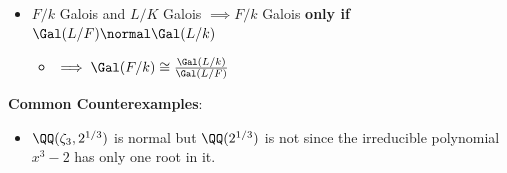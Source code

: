 \begin{itemize}
\tightlist
\item
  \(F/k\) Galois and \(L/K\) Galois \(\implies F/k\) Galois \textbf{only
  if} \(\Gal(L/F) \normal \Gal(L/k)\)

  \begin{itemize}
  \tightlist
  \item
    \(\implies \Gal(F/k) \cong \frac{\Gal(L/k)}{\Gal(L/F)}\)
  \end{itemize}
\end{itemize}

\begin{center}
\end{center}

\textbf{Common Counterexamples}:

\begin{itemize}
\tightlist
\item
  \(\QQ(\zeta_3, 2^{1/3})\) is normal but \(\QQ(2^{1/3})\) is not since
  the irreducible polynomial \(x^3 - 2\) has only one root in it.
\end{itemize}


